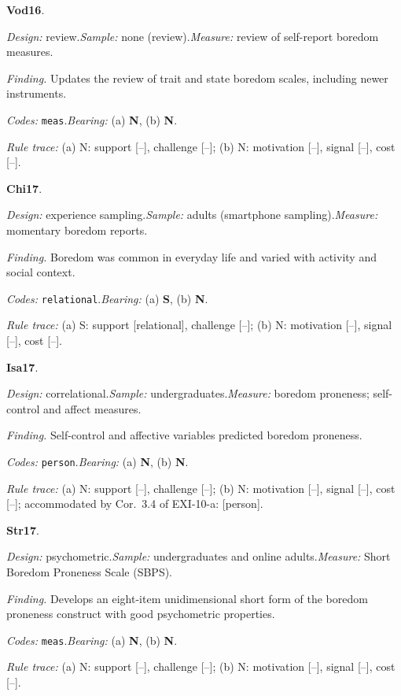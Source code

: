 \noindent\textbf{Vod16}\enspace \citet{VodanovichWatt2016}.\par
{\small\noindent\textit{Design:} review.\quad \textit{Sample:} none (review).\quad \textit{Measure:} review of self-report boredom measures.\par
\noindent\textit{Finding.} Updates the review of trait and state boredom scales, including newer instruments.\par
\noindent\textit{Codes:} \texttt{meas}.\quad \textit{Bearing:} (a) \textbf{N}, (b) \textbf{N}.\par
\noindent\textit{Rule trace:} (a) N: support {[}--{]}, challenge {[}--{]}; (b) N: motivation {[}--{]}, signal {[}--{]}, cost {[}--{]}.\par}
\medskip
{}
\noindent\textbf{Chi17}\enspace \citet{Chin2017}.\par
{\small\noindent\textit{Design:} experience sampling.\quad \textit{Sample:} adults (smartphone sampling).\quad \textit{Measure:} momentary boredom reports.\par
\noindent\textit{Finding.} Boredom was common in everyday life and varied with activity and social context.\par
\noindent\textit{Codes:} \texttt{relational}.\quad \textit{Bearing:} (a) \textbf{S}, (b) \textbf{N}.\par
\noindent\textit{Rule trace:} (a) S: support {[}relational{]}, challenge {[}--{]}; (b) N: motivation {[}--{]}, signal {[}--{]}, cost {[}--{]}.\par}
\medskip
{}
\noindent\textbf{Isa17}\enspace \citet{Isacescu2017}.\par
{\small\noindent\textit{Design:} correlational.\quad \textit{Sample:} undergraduates.\quad \textit{Measure:} boredom proneness; self-control and affect measures.\par
\noindent\textit{Finding.} Self-control and affective variables predicted boredom proneness.\par
\noindent\textit{Codes:} \texttt{person}.\quad \textit{Bearing:} (a) \textbf{N}, (b) \textbf{N}.\par
\noindent\textit{Rule trace:} (a) N: support {[}--{]}, challenge {[}--{]}; (b) N: motivation {[}--{]}, signal {[}--{]}, cost {[}--{]}; accommodated by Cor.~3.4 of EXI-10-a: {[}person{]}.\par}
\medskip
{}
\noindent\textbf{Str17}\enspace \citet{Struk2017}.\par
{\small\noindent\textit{Design:} psychometric.\quad \textit{Sample:} undergraduates and online adults.\quad \textit{Measure:} Short Boredom Proneness Scale (SBPS).\par
\noindent\textit{Finding.} Develops an eight-item unidimensional short form of the boredom proneness construct with good psychometric properties.\par
\noindent\textit{Codes:} \texttt{meas}.\quad \textit{Bearing:} (a) \textbf{N}, (b) \textbf{N}.\par
\noindent\textit{Rule trace:} (a) N: support {[}--{]}, challenge {[}--{]}; (b) N: motivation {[}--{]}, signal {[}--{]}, cost {[}--{]}.\par}
